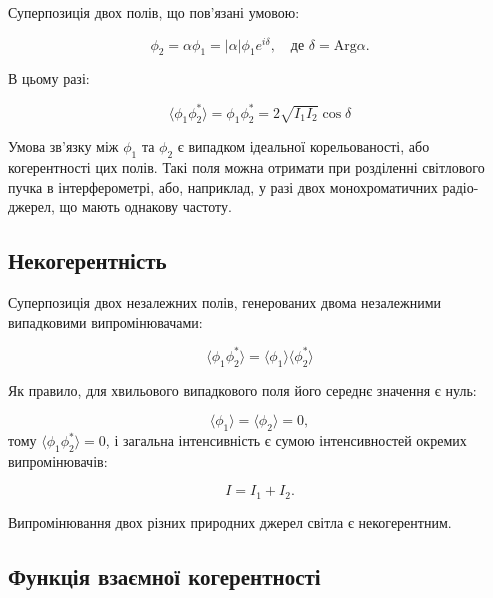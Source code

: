 Суперпозиція двох полів, що пов’язані умовою:

\begin{equation*}
\phi_2 = \alpha \phi_1 = |\alpha| \phi_1 e^{i\delta}, \quad \text{де } \delta = \text{Arg} \alpha.
\end{equation*}

В цьому разі:

\begin{equation*}
\langle \phi_1 \phi_2^{*} \rangle = \phi_1 \phi_2^{*} = 2\sqrt{I_1 I_2} \cos \delta
\end{equation*}

Умова зв’язку між \(\phi_1\) та \(\phi_2\) є випадком ідеальної корельованості, або когерентності цих полів. Такі поля можна отримати при розділенні
світлового пучка в інтерферометрі, або, наприклад, у разі двох монохроматичних радіо-джерел, що мають однакову частоту.


\subsection*{Некогерентність}

Суперпозиція двох незалежних полів, генерованих двома незалежними випадковими випромінювачами:

\begin{equation*}
\langle \phi_1 \phi_2^{*} \rangle = \langle \phi_1 \rangle \langle \phi_2^{*} \rangle
\end{equation*}

Як правило, для хвильового випадкового поля його середнє значення є нуль:

\begin{equation*}
\langle \phi_1 \rangle = \langle \phi_2 \rangle = 0,
\end{equation*}
%
тому \(\langle \phi_1 \phi_2^{*} \rangle = 0\), і загальна інтенсивність є сумою інтенсивностей окремих випромінювачів:

\begin{equation*}
I = I_1 + I_2.
\end{equation*}

Випромінювання двох різних природних джерел світла є некогерентним.

\subsection*{Функція взаємної когерентності}

